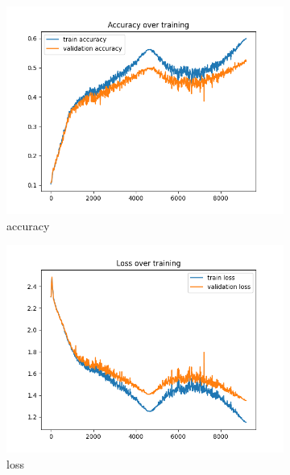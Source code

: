 \documentclass[a4paper]{article}
\begin{document}
\begin{figure}[h]
	\centering
	\begin{subfigure}{0.3\textwidth}
		\centering
		\includegraphics[width=\linewidth]{images/ex2_with_batch_9layer_acc.png}
		\caption{accuracy}
	\end{subfigure}
	\begin{subfigure}{0.3\textwidth}
		\centering
		\includegraphics[width=\linewidth]{images/ex2_with_batch_9layer_loss.png}
		\caption{loss}
	\end{subfigure}
	\begin{subfigure}{0.3\textwidth}
		\centering

\end{subfigure}
\end{figure}
\end{document}
